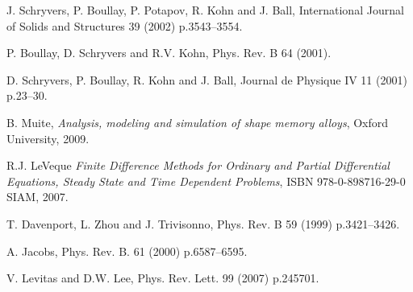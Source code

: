 \documentclass[twocolumn,amsmath,amssymb]{revtex4}
\begin{document}
\begin{thebibliography}{22}
J. Schryvers, P. Boullay, P. Potapov, R. Kohn and J. Ball, International
  Journal of Solids and Structures 39 (2002) p.3543--3554.

P. Boullay, D. Schryvers and R.V. Kohn, Phys. Rev. B 64 (2001).

D. Schryvers, P. Boullay, R. Kohn and J. Ball, Journal de Physique IV 11 (2001)
  p.23--30.

B. Muite, {\itshape Analysis, modeling and simulation of shape memory alloys},
  Oxford University, 2009.

R.J. LeVeque {\itshape {F}inite {D}ifference {M}ethods for {O}rdinary and
  {P}artial {D}ifferential {E}quations, {S}teady {S}tate and {T}ime {D}ependent
  {P}roblems},  ISBN 978-0-898716-29-0  SIAM, 2007.

T. Davenport, L. Zhou and J. Trivisonno, Phys. Rev. B 59 (1999) p.3421--3426.

A. Jacobs, Phys. Rev. B. 61 (2000) p.6587--6595.

V. Levitas and D.W. Lee, Phys. Rev. Lett. 99 (2007) p.245701.

\end{thebibliography}
\end{document}
